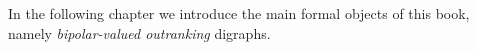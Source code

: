 \vspace{1cm}
In the following chapter we introduce the main formal objects of this book, namely \emph{bipolar-valued outranking} digraphs.

\clearpage


%